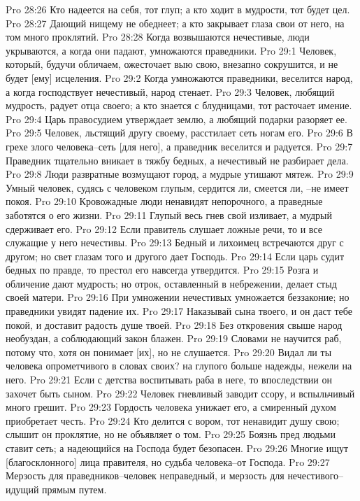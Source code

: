 Pro 28:26  Кто надеется на себя, тот глуп; а кто ходит в мудрости, тот будет цел.
Pro 28:27  Дающий нищему не обеднеет; а кто закрывает глаза свои от него, на том много проклятий.
Pro 28:28  Когда возвышаются нечестивые, люди укрываются, а когда они падают, умножаются праведники.
Pro 29:1  Человек, который, будучи обличаем, ожесточает выю свою, внезапно сокрушится, и не будет [ему] исцеления.
Pro 29:2  Когда умножаются праведники, веселится народ, а когда господствует нечестивый, народ стенает.
Pro 29:3  Человек, любящий мудрость, радует отца своего; а кто знается с блудницами, тот расточает имение.
Pro 29:4  Царь правосудием утверждает землю, а любящий подарки разоряет ее.
Pro 29:5  Человек, льстящий другу своему, расстилает сеть ногам его.
Pro 29:6  В грехе злого человека--сеть [для него], а праведник веселится и радуется.
Pro 29:7  Праведник тщательно вникает в тяжбу бедных, а нечестивый не разбирает дела.
Pro 29:8  Люди развратные возмущают город, а мудрые утишают мятеж.
Pro 29:9  Умный человек, судясь с человеком глупым, сердится ли, смеется ли, --не имеет покоя.
Pro 29:10  Кровожадные люди ненавидят непорочного, а праведные заботятся о его жизни.
Pro 29:11  Глупый весь гнев свой изливает, а мудрый сдерживает его.
Pro 29:12  Если правитель слушает ложные речи, то и все служащие у него нечестивы.
Pro 29:13  Бедный и лихоимец встречаются друг с другом; но свет глазам того и другого дает Господь.
Pro 29:14  Если царь судит бедных по правде, то престол его навсегда утвердится.
Pro 29:15  Розга и обличение дают мудрость; но отрок, оставленный в небрежении, делает стыд своей матери.
Pro 29:16  При умножении нечестивых умножается беззаконие; но праведники увидят падение их.
Pro 29:17  Наказывай сына твоего, и он даст тебе покой, и доставит радость душе твоей.
Pro 29:18  Без откровения свыше народ необуздан, а соблюдающий закон блажен.
Pro 29:19  Словами не научится раб, потому что, хотя он понимает [их], но не слушается.
Pro 29:20  Видал ли ты человека опрометчивого в словах своих? на глупого больше надежды, нежели на него.
Pro 29:21  Если с детства воспитывать раба в неге, то впоследствии он захочет быть сыном.
Pro 29:22  Человек гневливый заводит ссору, и вспыльчивый много грешит.
Pro 29:23  Гордость человека унижает его, а смиренный духом приобретает честь.
Pro 29:24  Кто делится с вором, тот ненавидит душу свою; слышит он проклятие, но не объявляет о том.
Pro 29:25  Боязнь пред людьми ставит сеть; а надеющийся на Господа будет безопасен.
Pro 29:26  Многие ищут [благосклонного] лица правителя, но судьба человека--от Господа.
Pro 29:27  Мерзость для праведников--человек неправедный, и мерзость для нечестивого--идущий прямым путем.
